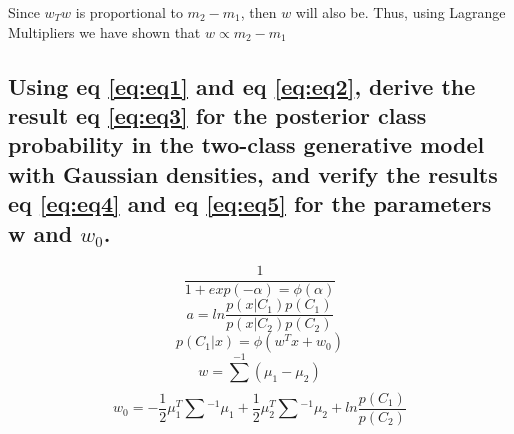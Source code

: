 \documentclass{article}
\begin{document}
		Since $w_{T}w$ is proportional to $m_{2} - m_{1}$, then $w$ will also be. 
		Thus, using Lagrange Multipliers we have shown that $w \propto m_{2} - m_{1}$ 
	\subsection{Using eq \ref{eq:eq1} and eq \ref{eq:eq2}, derive the result eq \ref{eq:eq3} for the posterior class
		probability in the two-class generative model with Gaussian densities, and verify the
		results eq \ref{eq:eq4} and eq \ref{eq:eq5} for the parameters w and $w_{0}$.}
		\begin{equation}
			\label{eq:eq1}
			\frac{1}{1 + exp(-\alpha) = \phi(\alpha)}
		\end{equation}
		\begin{equation}
			\label{eq:eq2}
			a = ln\frac{p(x|C_{1})p(C_{1})}{p(x|C_{2})p(C_{2})}	
		\end{equation}
		\begin{equation}
			\label{eq:eq3}
			p(C_{1}|x) = \phi(w^{T}x + w_{0})
		\end{equation}
		\begin{equation}
			\label{eq:eq4}
			w = \sum_{}^{-1}(\mu_{1} - \mu_{2})
		\end{equation}
		\begin{equation}
			\label{eq:eq5}
				w_{0} = -\frac{1}{2}\mu^{T}_{1}\sum_{}^{}^{-1}\mu_{1} + \frac{1}{2}\mu_{2}^{T}\sum_{}^{}^{-1}\mu_{2} + ln\frac{p(C_{1})}{p(C_{2})}
		\end{equation}
\end{document}
